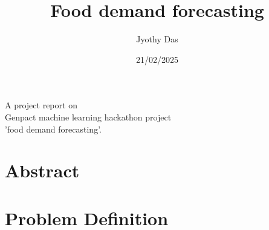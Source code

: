 \documentclass[12pt]{article}
\begin{document}
\title{Food demand forecasting}

\author{ Jyothy Das}
\date{21/02/2025}
\maketitle

\vspace{30pt}
\begin{center}
A project report on\\
Genpact machine learning hackathon project\\
'food demand forecasting'.\\
\end{center}

\vspace{20pt}


\tableofcontents
\listoffigures
\listoftables

\newpage
\section{Abstract}
\begin{comment}
This research aims to develop a predictive model for farmers' contributions to the Pradhan Mantri Fasal Bima Yojana (PMFBY), 
an agricultural insurance scheme in India. Utilizing historical data on crop insurance coverage, the study will identify patterns and trends in farmer contributions, 
considering factors like crop type, state policies, and premium rates. The analysis will inform the optimization of government subsidies to maximize coverage 
while ensuring equitable access. Furthermore, the research will enhance transparency and informed decision-making in policy design. 
The final model will be deployed as an interactive web application using Flask, enabling stakeholders to explore predictions and their implications dynamically.
\end{comment}
\section{Problem Definition}
\end{document}
